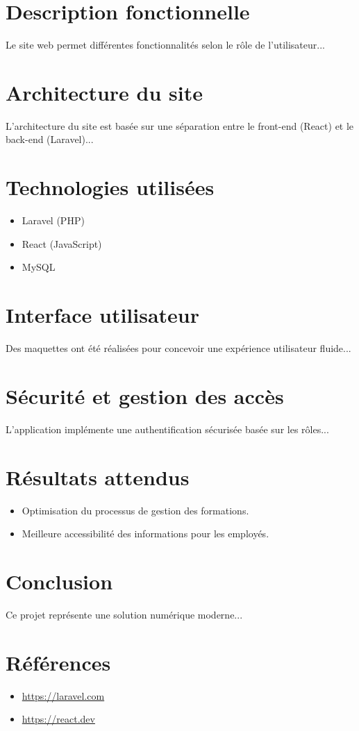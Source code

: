 \documentclass[12pt,a4paper]{report}
\begin{document}
\chapter{Description fonctionnelle}
Le site web permet différentes fonctionnalités selon le rôle de l'utilisateur...

\chapter{Architecture du site}
L'architecture du site est basée sur une séparation entre le front-end (React) et le back-end (Laravel)...

\chapter{Technologies utilisées}
\begin{itemize}
    \item Laravel (PHP)
    \item React (JavaScript)
    \item MySQL
\end{itemize}

\chapter{Interface utilisateur}
Des maquettes ont été réalisées pour concevoir une expérience utilisateur fluide...

\chapter{Sécurité et gestion des accès}
L'application implémente une authentification sécurisée basée sur les rôles...

\chapter{Résultats attendus}
\begin{itemize}
    \item Optimisation du processus de gestion des formations.
    \item Meilleure accessibilité des informations pour les employés.
\end{itemize}

\chapter{Conclusion}
Ce projet représente une solution numérique moderne...

\chapter*{Références}
\begin{itemize}
    \item \url{https://laravel.com}
    \item \url{https://react.dev}
\end{itemize}
\end{document}

